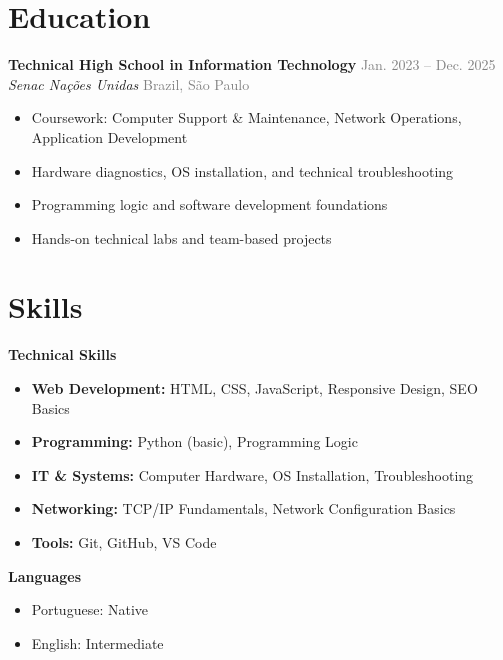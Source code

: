 \documentclass[a4paper, 12pt]{article}
\newcommand{\resumeSubSection}[4]{%
\noindent
\textbf{#1} \hfill \textcolor{gray}{#2}\\
\textit{#3} \hfill \textcolor{gray}{#4}
}
\newcommand{\resumeItemsSubSection}[1]{%
\vspace{-9}\small \begin{itemize}\setlength{\itemsep}{-0.3em}
#1
\end{itemize}
}
\newcommand{\resumeSkillSubsection}[1]{%
\noindent \textbf{#1}\\[-6pt]
}
\begin{document}
\section{Education}
\resumeSubSection
{Technical High School in Information Technology}
{Jan. 2023 -- Dec. 2025}
{Senac Nações Unidas}
{Brazil, São Paulo}

\resumeItemsSubSection{
\item Coursework: Computer Support \& Maintenance, Network Operations, Application Development
\item Hardware diagnostics, OS installation, and technical troubleshooting
\item Programming logic and software development foundations
\item Hands-on technical labs and team-based projects
}

\section{Skills}

\resumeSkillSubsection{Technical Skills}

\resumeItemsSubSection{
\item \textbf{Web Development:} HTML, CSS, JavaScript, Responsive Design, SEO Basics
\item \textbf{Programming:} Python (basic), Programming Logic
\item \textbf{IT \& Systems:} Computer Hardware, OS Installation, Troubleshooting
\item \textbf{Networking:} TCP/IP Fundamentals, Network Configuration Basics
\item \textbf{Tools:} Git, GitHub, VS Code
}

\resumeSkillSubsection{Languages}
\resumeItemsSubSection{
\item Portuguese: Native
\item English: Intermediate
}
\end{document}
